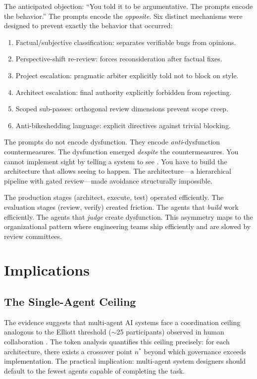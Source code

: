 \documentclass[11pt,a4paper]{article}
\begin{document}
The anticipated objection: ``You told it to be argumentative. The prompts encode the behavior.'' The prompts encode the \emph{opposite}. Six distinct mechanisms were designed to prevent exactly the behavior that occurred:

\begin{enumerate}
\item Factual/subjective classification: separates verifiable bugs from opinions.
\item Perspective-shift re-review: forces reconsideration after factual fixes.
\item Project escalation: pragmatic arbiter explicitly told not to block on style.
\item Architect escalation: final authority explicitly forbidden from rejecting.
\item Scoped sub-passes: orthogonal review dimensions prevent scope creep.
\item Anti-bikeshedding language: explicit directives against trivial blocking.
\end{enumerate}

The prompts do not encode dysfunction. They encode \emph{anti}-dysfunction countermeasures. The dysfunction emerged \emph{despite} the countermeasures. You cannot implement sight by telling a system to see \citep{mcentire2025cage}. You have to build the architecture that allows seeing to happen. The architecture---a hierarchical pipeline with gated review---made avoidance structurally impossible.

The production stages (architect, execute, test) operated efficiently. The evaluation stages (review, verify) created friction. The agents that \emph{build} work efficiently. The agents that \emph{judge} create dysfunction. This asymmetry maps to the organizational pattern where engineering teams ship efficiently and are slowed by review committees.


\section{Implications}
\label{sec:implications}

\subsection{The Single-Agent Ceiling}

The evidence suggests that multi-agent AI systems face a coordination ceiling analogous to the Elliott threshold ($\sim$25 participants) observed in human collaboration \citep{elliott2007}. The token analysis quantifies this ceiling precisely: for each architecture, there exists a crossover point $n^*$ beyond which governance exceeds implementation. The practical implication: multi-agent system designers should default to the fewest agents capable of completing the task.
\end{document}
